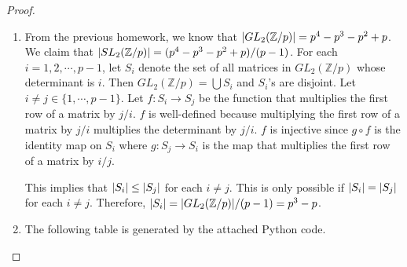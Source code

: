 \documentclass[12pt, psamsfonts]{amsart}
\theoremstyle{definition}
\theoremstyle{remark}
\numberwithin{equation}{section}
\begin{document}
\begin{proof}
  $ $
  \begin{enumerate}
    \item
      From the previous homework, we know that $\abs{GL_2(\mathbb{Z}/p)} = p^4 - p^3 - p^2 + p$.
      We claim that $\abs{SL_2(\mathbb{Z}/p)} = (p^4 - p^3 - p^2 + p) / (p - 1)$.
      For each $i = 1, 2, \cdots, p - 1$, let $S_i$ denote the set of all matrices in $GL_2(\mathbb{Z}/p)$ whose determinant is $i$.
      Then $GL_2(\mathbb{Z}/p) = \bigcup S_i$ and $S_i$'s are disjoint.
      Let $i \ne j \in \{ 1, \cdots, p - 1 \}$.
      Let $f: S_i \rightarrow S_j$ be the function that multiplies the first row of a matrix by $j / i$.
      $f$ is well-defined because multiplying the first row of a matrix by $j / i$ multiplies the determinant by $j /i$.
      $f$ is injective since $g \circ f$ is the identity map on $S_i$ where $g: S_j \rightarrow S_i$ is the map that multiplies the first row of a matrix by $i / j$.

      This implies that $\abs{S_i} \leq \abs{S_j}$ for each $i \neq j$.
      This is only possible if $\abs{S_i} = \abs{S_j}$ for each $i \ne j$.
      Therefore, $\abs{S_i} = \abs{GL_2(\mathbb{Z}/p)} / (p - 1) = p^3 - p$.
    \item
      The following table is generated by the attached Python code.


\end{enumerate}
\end{proof}
\end{document}
